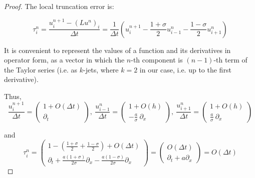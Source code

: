 \documentclass[a4paper]{amsproc}
\theoremstyle{plain}
\theoremstyle{definition}
\theoremstyle{remark}
\numberwithin{equation}{section}
\begin{document}
\begin{proof}

The local truncation error is:

 $$\tau^n_i = \frac{u^{n+1}_i - (Lu^n)_i}{\Delta t} = \frac{1}{\Delta t} (u^{n+1}_i - \frac{1+\sigma}{2} u^n_{i-1} - \frac{1-\sigma}{2} u^n_{i+1})  $$
 
 It is convenient to represent the values of a function and its derivatives in operator form, as a vector in which the $n$-th component is $(n-1)$-th term of the Taylor series (i.e. as $k$-jets, where $k = 2$ in our case, i.e. up to the first derivative).
 
 Thus,  $$ \frac{u^{n+1}_i}{\Delta t} = \begin{pmatrix} 1 + O(\Delta t) \\ \partial_{t} \end{pmatrix}, 
 ~ \frac{u^n_{i-1}}{\Delta t} = \begin{pmatrix} 1 + O(h) \\ -\frac{a}{\sigma} ~\partial_{x}\end{pmatrix},
 ~ \frac{u^n_{i+1}}{\Delta t} = \begin{pmatrix} 1 + O(h)\\ \frac{a}{\sigma} ~\partial_{x} \end{pmatrix} $$ 
 
 and $$ \tau^n_i = \begin{pmatrix} 
 1 - (\frac{1+\sigma}{2} + \frac{1-\sigma}{2}) + O(\Delta t) 
 \\ \partial_{t} + \frac{a(1+\sigma)}{2\sigma}\partial_{x}  - \frac{a(1-\sigma)}{2\sigma}\partial_{x} \end{pmatrix}  = \begin{pmatrix} O(\Delta t) \\ \partial_{t} + a \partial_{x} \end{pmatrix} = O(\Delta t)$$ 



\end{proof}
\end{document}
